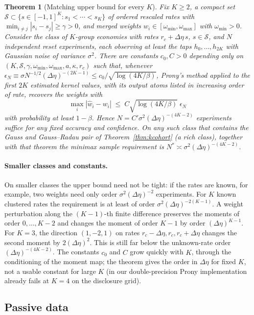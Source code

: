 \documentclass[12pt]{article}
\newtheorem{theorem}{Theorem}[section]
\theoremstyle{definition}
\theoremstyle{remark}
\begin{document}
\begin{theorem}[Matching upper bound for every $K$]\label{prop:esprit}
Fix $K\ge2$, a compact set $\mathcal S\subset\{s\in[-1,1]^K:s_1<\cdots<s_K\}$ of ordered rescaled rates with $\min_{i\ne j}|s_i-s_j|\ge\gamma>0$, and merged weights $w_i\in[\omega_{\min},\omega_{\max}]$ with $\omega_{\min}>0$. Consider the class of $K$-group economies with rates $r_c+\Delta\eta\,s$, $s\in\mathcal S$, and $N$ independent reset experiments, each observing at least the taps $h_0,\ldots,h_{2K}$ with Gaussian noise of variance $\sigma^2$. There are constants $c_0,C>0$ depending only on $(K,\mathcal S,\gamma,\omega_{\min},\omega_{\max},a,\kappa,r_c)$ such that, whenever $\epsilon_N\equiv\sigma N^{-1/2}(\Delta\eta)^{-(2K-1)}\le c_0/\sqrt{\log(4K/\beta)}$, Prony's method applied to the first $2K$ estimated kernel values, with its output atoms listed in increasing order of rate, recovers the weights with
\[
\max_i|\hat w_i-w_i|\;\le\;C\sqrt{\log(4K/\beta)}\;\epsilon_N
\]
with probability at least $1-\beta$. Hence $N=C'\sigma^2(\Delta\eta)^{-(4K-2)}$ experiments suffice for any fixed accuracy and confidence. On any such class that contains the Gauss and Gauss--Radau pair of Theorem~\ref{thm:kcohort} (a rich class), together with that theorem the minimax sample requirement is $N^*\asymp\sigma^2(\Delta\eta)^{-(4K-2)}$.
\end{theorem}

\paragraph{Smaller classes and constants.} On smaller classes the upper bound need not be tight: if the rates are known, for example, two weights need only order $\sigma^2(\Delta\eta)^{-2}$ experiments. For $K$ known clustered rates the requirement is at least of order $\sigma^2(\Delta\eta)^{-2(K-1)}$. A weight perturbation along the $(K-1)$-th finite difference preserves the moments of order $0,\ldots,K-2$ and changes the moment of order $K-1$ by order $(\Delta\eta)^{K-1}$. For $K=3$, the direction $(1,-2,1)$ on rates $r_c-\Delta\eta,r_c,r_c+\Delta\eta$ changes the second moment by $2(\Delta\eta)^2$. This is still far below the unknown-rate order $(\Delta\eta)^{-(4K-2)}$. The constants $c_0$ and $C$ grow quickly with $K$, through the conditioning of the moment map; the theorem gives the order in $\Delta\eta$ for fixed $K$, not a usable constant for large $K$ (in \citet{niroula2026a} our double-precision Prony implementation already fails at $K=4$ on the disclosure grid).
\subsection{Passive data}
\end{document}
